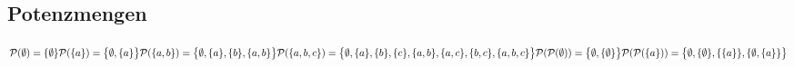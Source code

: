 \subsection*{Potenzmengen}
  $  \mathcal P(\emptyset) = \{ \emptyset \}\mathcal P(\{ a \}) = \bigl\{ \emptyset, \{ a \} \bigr\}\\
    \mathcal P(\{ a, b \}) = \bigl\{ \emptyset, \{ a \}, \{ b \}, \{ a, b \} \bigr\}\\
    \mathcal P(\{ a, b, c \}) = \bigl\{ \emptyset, \{ a \}, \{ b \}, \{ c \}, \{ a, b \}, \{ a, c \}, \{ b, c \}, \{ a, b, c \} \bigr\}\\
    \mathcal P(\mathcal P(\emptyset)) = \bigl\{ \emptyset, \{\emptyset\}\bigr\}\\
    \mathcal P(\mathcal P(\{a\})) = \bigl\{ \emptyset, \{\emptyset\} , \{\{a\}\} , \{\emptyset , \{a\}\} \bigr\}$